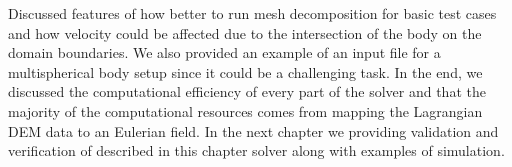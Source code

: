 Discussed features of how better to run mesh decomposition for basic test cases and how velocity could be affected due to the intersection of the body on the domain boundaries. We also provided an example of an input file for a multispherical body setup since it could be a challenging task. In the end, we discussed the computational efficiency of every part of the solver and that the majority of the computational resources comes from mapping the Lagrangian DEM data to an Eulerian field. In the next chapter we providing validation and verification of described in this chapter solver along with examples of simulation. 
